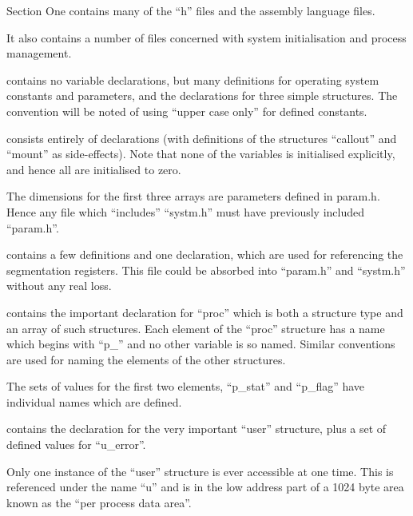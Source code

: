 
Section One contains many of the ``h''
files and the assembly language files.

It also contains a number of files concerned 
with system initialisation and
process management.


\bd
\item[param.h] [Sheet 01] contains no variable 
declarations, but many definitions 
for operating system constants
and parameters, and the declarations
for three simple structures. The
convention will be noted of using
``upper case only'' for defined constants.


\item[systm.h] [Sheet 02; Chapter 19] consists 
entirely of declarations (with
definitions of the structures ``callout''
and ``mount'' as side-effects).
Note that none of the variables is
initialised explicitly, and hence
all are initialised to zero.

The dimensions for the first three
arrays are parameters defined in
param.h. Hence any file which
``includes'' ``systm.h'' must have
previously included ``param.h''.

\item[seg.h] [Sheet 03] contains a few
definitions and one declaration,
which are used for referencing the
segmentation registers. This file
could be absorbed into ``param.h'' and
``systm.h'' without any real loss.

\item[proc.h] [Sheet 03; Chapter 7] contains 
the important declaration for
``proc'' which is both a structure
type and an array of such structures.
Each element of the ``proc''
structure has a name which begins
with ``p\_'' and no other variable is
so named. Similar conventions are
used for naming the elements of the
other structures.

The sets of values for the first two
elements, ``p\_stat'' and ``p\_flag''
have individual names which are
defined.


\item[user.h] [Sheet 04; Chapter 7] contains 
the declaration for the very
important ``user'' structure, plus a
set of defined values for ``u\_error''.

Only one instance of the ``user''
structure is ever accessible at one
time. This is referenced under the
name ``u'' and is in the low address
part of a 1024 byte area known as
the ``per process data area''.

